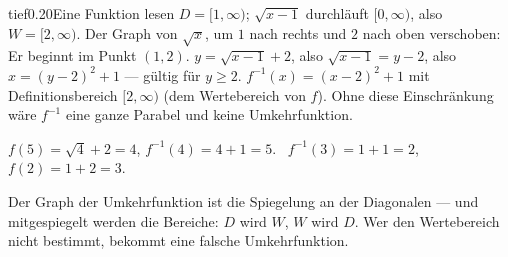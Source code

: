 \begin{loesungkarte}{tief}{0.20}{Eine Funktion lesen}
$D = [1, \infty)$; $\sqrt{x - 1}$ durchläuft $[0, \infty)$, also $W = [2, \infty)$.
Der Graph von $\sqrt x$, um $1$ nach rechts und $2$ nach oben verschoben: Er beginnt im Punkt $(1, 2)$.
$y = \sqrt{x - 1} + 2$, also $\sqrt{x - 1} = y - 2$, also $x = (y - 2)^{2} + 1$ --- gültig für $y\ge2$. $f^{-1}(x) = (x - 2)^{2} + 1$ mit Definitionsbereich $[2, \infty)$ (dem Wertebereich von $f$). Ohne diese Einschränkung wäre $f^{-1}$ eine ganze Parabel und keine Umkehrfunktion.
\begin{center}
\end{center}
$f(5) = \sqrt4 + 2 = 4$, $f^{-1}(4) = 4 + 1 = 5$. \checkmark\ $f^{-1}(3) = 1 + 1 = 2$, $f(2) = 1 + 2 = 3$. \checkmark
\begin{mitnehmen}\kastentext
Der Graph der Umkehrfunktion ist die Spiegelung an der Diagonalen --- und mitgespiegelt werden die Bereiche: $D$ wird $W$, $W$ wird $D$. Wer den Wertebereich nicht bestimmt, bekommt eine falsche Umkehrfunktion.
\end{mitnehmen}
\end{loesungkarte}

